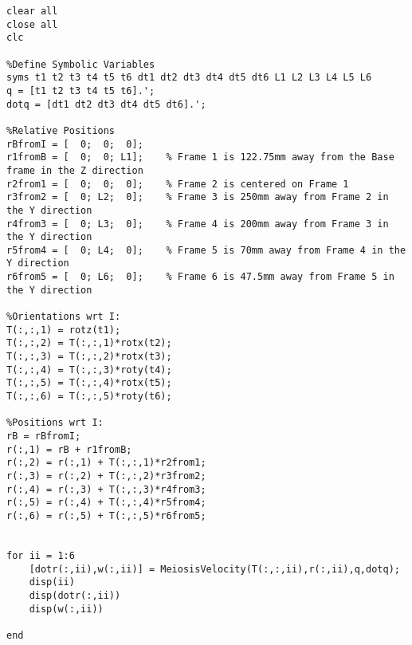 \begin{lstlisting}[frame=lines,style=Matlab-editor,basicstyle = \mlttfamily, caption=Velocity Kinematics Code]
clear all
close all
clc

%Define Symbolic Variables
syms t1 t2 t3 t4 t5 t6 dt1 dt2 dt3 dt4 dt5 dt6 L1 L2 L3 L4 L5 L6
q = [t1 t2 t3 t4 t5 t6].';
dotq = [dt1 dt2 dt3 dt4 dt5 dt6].';

%Relative Positions
rBfromI = [  0;  0;  0];
r1fromB = [  0;  0; L1];    % Frame 1 is 122.75mm away from the Base frame in the Z direction
r2from1 = [  0;  0;  0];    % Frame 2 is centered on Frame 1
r3from2 = [  0; L2;  0];    % Frame 3 is 250mm away from Frame 2 in the Y direction
r4from3 = [  0; L3;  0];    % Frame 4 is 200mm away from Frame 3 in the Y direction
r5from4 = [  0; L4;  0];    % Frame 5 is 70mm away from Frame 4 in the Y direction
r6from5 = [  0; L6;  0];    % Frame 6 is 47.5mm away from Frame 5 in the Y direction

%Orientations wrt I:
T(:,:,1) = rotz(t1);
T(:,:,2) = T(:,:,1)*rotx(t2);
T(:,:,3) = T(:,:,2)*rotx(t3);
T(:,:,4) = T(:,:,3)*roty(t4);
T(:,:,5) = T(:,:,4)*rotx(t5);
T(:,:,6) = T(:,:,5)*roty(t6);

%Positions wrt I:
rB = rBfromI;
r(:,1) = rB + r1fromB;
r(:,2) = r(:,1) + T(:,:,1)*r2from1;
r(:,3) = r(:,2) + T(:,:,2)*r3from2;
r(:,4) = r(:,3) + T(:,:,3)*r4from3;
r(:,5) = r(:,4) + T(:,:,4)*r5from4;
r(:,6) = r(:,5) + T(:,:,5)*r6from5;


for ii = 1:6
    [dotr(:,ii),w(:,ii)] = MeiosisVelocity(T(:,:,ii),r(:,ii),q,dotq);
    disp(ii)
    disp(dotr(:,ii))
    disp(w(:,ii))

end

\end{lstlisting}
